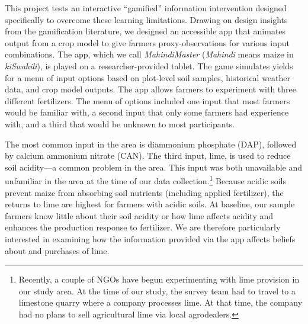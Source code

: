\documentclass[12pt,letterpaper]{article}
\begin{document}



This project tests an interactive ``gamified'' information intervention designed specifically to overcome these learning limitations. Drawing on design insights from the gamification literature, we designed an accessible app that animates output from a crop model to give farmers proxy-observations for various input combinations. The app, which we call \textit{MahindiMaster} (\textit{Mahindi} means maize in \textit{kiSwahili}), is played on a researcher-provided tablet. The game simulates yields for a menu of input options based on plot-level soil samples, historical weather data, and crop model outputs. The app allows farmers to experiment with three different fertilizers. The menu of options included one input that most farmers would be familiar with, a second input that only some farmers had experience with, and a third that would be unknown to most participants. 

The most common input in the area is diammonium phosphate (DAP), followed by calcium ammonium nitrate (CAN). The third input, lime, is used to reduce soil acidity---a common problem in the area. This input was both unavailable and unfamiliar in the area at the time of our data collection.\footnote{Recently, a couple of NGOs have begun experimenting with lime provision in our study area. At the time of our study, the survey team had to travel to a limestone quarry where a company processes lime. At that time, the company had no plans to sell agricultural lime via local agrodealers.} Because acidic soils prevent maize from absorbing soil nutrients (including applied fertilizer), the returns to lime are  highest for farmers with acidic soils. At baseline, our sample farmers know little about their soil acidity or how lime affects acidity and enhances the production response to fertilizer. We are therefore particularly interested in examining how the information provided via the app affects beliefs about and purchases of lime. 
\end{document}
